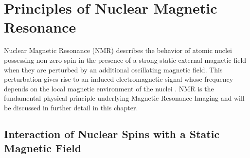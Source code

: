 \section{Principles of Nuclear Magnetic Resonance}


    \par Nuclear Magnetic Resonance (NMR) describes the behavior of atomic nuclei possessing non-zero spin in the presence of a strong static external magnetic field when they are perturbed by an additional oscillating magnetic field. This perturbation gives rise to an induced electromagnetic signal whose frequency depends on the local magnetic environment of the nuclei \citep{Rabi1938, blochNuclearInductionExperiment1946, haydenHistoryPhysicalPrinciples2016}. NMR is the fundamental physical principle underlying Magnetic Resonance Imaging \citep{currieUnderstandingMRIBasic2013, lauterburImageFormationInduced1973, mansfieldMultiplanarImageFormation1977} and will be discussed in further detail in this chapter.


\subsection{Interaction of Nuclear Spins with a Static Magnetic Field}

